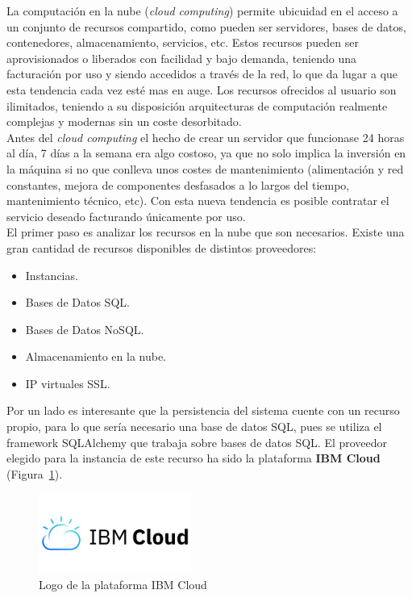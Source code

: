 La computación en la nube (\textit{cloud computing}) permite ubicuidad en el acceso a un conjunto de recursos compartido, como pueden ser servidores, bases de datos, contenedores, almacenamiento, servicios, etc. Estos recursos pueden ser aprovisionados o liberados con facilidad y bajo demanda, teniendo una facturación por uso y siendo accedidos a través de la red, lo que da lugar a que esta tendencia cada vez esté mas en auge. Los recursos ofrecidos al usuario son ilimitados, teniendo a su disposición arquitecturas de computación realmente complejas y modernas sin un coste desorbitado.\\
Antes del \textit{cloud computing} el hecho de crear un servidor que funcionase 24 horas al día, 7 días a la semana era algo costoso, ya que no solo implica la inversión en la máquina si no que conlleva unos costes de mantenimiento (alimentación y red constantes, mejora de componentes desfasados a lo largos del tiempo, mantenimiento técnico, etc). Con esta nueva tendencia es posible contratar el servicio deseado facturando únicamente por uso.\\

El primer paso es analizar los recursos en la nube que son necesarios. Existe una gran cantidad de recursos disponibles de distintos proveedores:
\begin{itemize}
\item Instancias.
\item Bases de Datos SQL.
\item Bases de Datos NoSQL.
\item Almacenamiento en la nube.
\item IP virtuales SSL.
\end{itemize}

Por un lado es interesante que la persistencia del sistema cuente con un recurso propio, para lo que sería necesario una base de datos SQL, pues se utiliza el framework SQLAlchemy que trabaja sobre bases de datos SQL. El proveedor elegido para la instancia de este recurso ha sido la plataforma \textbf{IBM Cloud}~\cite{IBM} (Figura~\ref{fig:IBMCloud}).
\begin{figure}[H]
            \centering
            \includegraphics[width=5cm]{figs/ibm_logo.png}
            \caption{Logo de la plataforma IBM Cloud}
            \label{fig:IBMCloud}
\end{figure}

